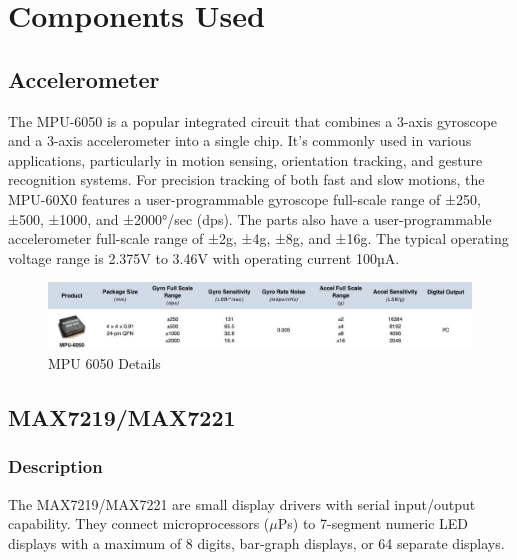 \newpage
\section{Components Used}

\subsection{Accelerometer}
The MPU-6050 is a popular integrated circuit that combines a 3-axis gyroscope and a 3-axis accelerometer into a single chip. It's commonly used in various applications, particularly in motion sensing, orientation tracking, and gesture recognition systems.
For precision tracking of both fast and slow motions, the MPU-60X0 features a user-programmable gyroscope full-scale range of ±250, ±500, ±1000, and ±2000°/sec (dps). The parts also have a user-programmable accelerometer full-scale range of ±2g, ±4g, ±8g, and ±16g. The typical operating voltage range is 2.375V to 3.46V with operating current 100µA.
\begin{figure}[H]
    \centering
    \includegraphics[width=1\linewidth]{Files/Images/Accelerometer.jpg}
    \caption{MPU 6050 Details}
    \label{fig:enter-label}
\end{figure}

\subsection{MAX7219/MAX7221}
\subsubsection*{Description}
The MAX7219/MAX7221 are small display drivers with serial input/output capability. They connect microprocessors ($\mu$Ps) to 7-segment numeric LED displays with a maximum of 8 digits, bar-graph displays, or 64 separate displays.

